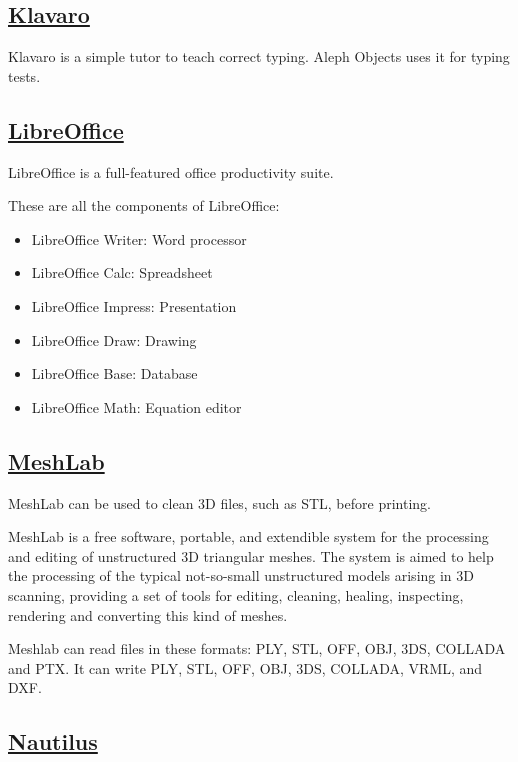 \subsection{\href{http://klavaro.sourceforge.net/}{Klavaro}}

Klavaro is a simple tutor to teach correct typing.
Aleph Objects uses it for typing tests.
 
\subsection{\href{http://www.libreoffice.org}{LibreOffice}}

 LibreOffice is a full-featured office productivity suite.
 
 These are all the components of LibreOffice:

\begin{itemize}
 \item LibreOffice Writer: Word processor
 \item LibreOffice Calc: Spreadsheet
 \item LibreOffice Impress: Presentation
 \item LibreOffice Draw: Drawing
 \item LibreOffice Base: Database
 \item LibreOffice Math: Equation editor
\end{itemize}
 
\subsection{\href{http://meshlab.sourceforge.net/}{MeshLab}}

MeshLab can be used to clean 3D files, such as STL, before printing.

 MeshLab is a free software, portable, and extendible system for the
 processing and editing of unstructured 3D triangular meshes.
 The system is aimed to help the processing of the typical not-so-small
 unstructured models arising in 3D scanning, providing a set of tools for
 editing, cleaning, healing, inspecting, rendering and converting this kind
 of meshes.
 
 Meshlab can read files in these formats: PLY, STL, OFF, OBJ, 3DS, COLLADA
 and PTX. It can write PLY, STL, OFF, OBJ, 3DS, COLLADA, VRML, and DXF.

\subsection{\href{http://www.gnome.org/projects/nautilus/}{Nautilus}}

